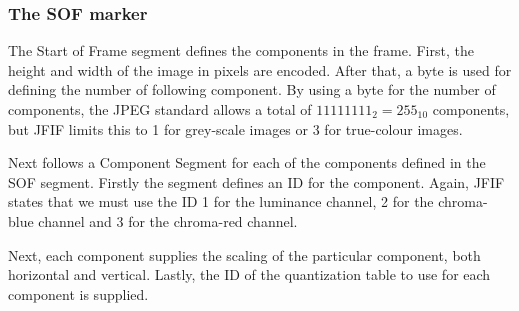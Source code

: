 \begin{infobox}
\subsubsection{The SOF marker}
\begin{centering}
\end{centering}

The Start of Frame segment defines the components in the frame. 
First, the height and width of the image in pixels are encoded. 
After that, a byte is used for defining the number of following component.
By using a byte for the number of components, the JPEG standard allows a total of $11111111_2=255_{10}$ components, but JFIF limits this to 1 for grey-scale images or 3 for true-colour images.

Next follows a Component Segment for each of the components defined in the SOF segment.
Firstly the segment defines an ID for the component.
Again, JFIF states that we must use the ID 1 for the luminance channel, 2 for the chroma-blue channel and 3 for the chroma-red channel.

Next, each component supplies the scaling of the particular component, both horizontal and vertical.
Lastly, the ID of the quantization table to use for each component is supplied. 

\begin{centering}
\end{centering}


\end{infobox}
